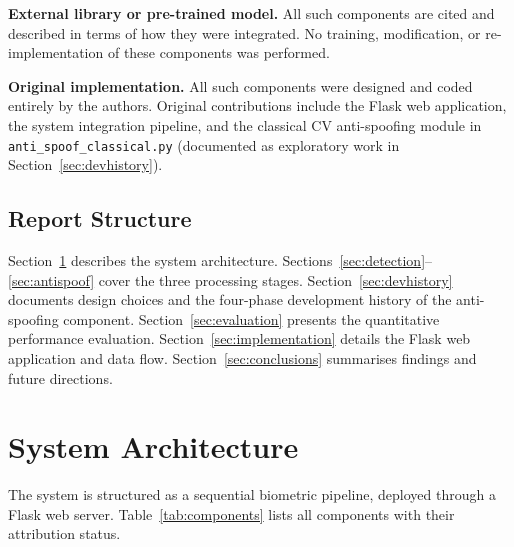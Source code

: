 \documentclass[11pt,a4paper]{article}
\begin{document}
\begin{externalbox}
  \textbf{External library or pre-trained model.}
  All such components are cited and described in terms of how they were integrated.
  No training, modification, or re-implementation of these components was performed.
\end{externalbox}

\begin{originalbox}
  \textbf{Original implementation.}
  All such components were designed and coded entirely by the authors.
  Original contributions include the Flask web application, the system integration
  pipeline, and the classical CV anti-spoofing module in
  \texttt{anti\_spoof\_classical.py} (documented as exploratory work in
  Section~\ref{sec:devhistory}).
\end{originalbox}

\subsection{Report Structure}

Section~\ref{sec:architecture} describes the system architecture.
Sections~\ref{sec:detection}--\ref{sec:antispoof} cover the three processing stages.
Section~\ref{sec:devhistory} documents design choices and the four-phase
development history of the anti-spoofing component.
Section~\ref{sec:evaluation} presents the quantitative performance evaluation.
Section~\ref{sec:implementation} details the Flask web application and data flow.
Section~\ref{sec:conclusions} summarises findings and future directions.

\section{System Architecture}
\label{sec:architecture}

The system is structured as a sequential biometric pipeline, deployed through a
Flask web server.
Table~\ref{tab:components} lists all components with their attribution status.
\end{document}
